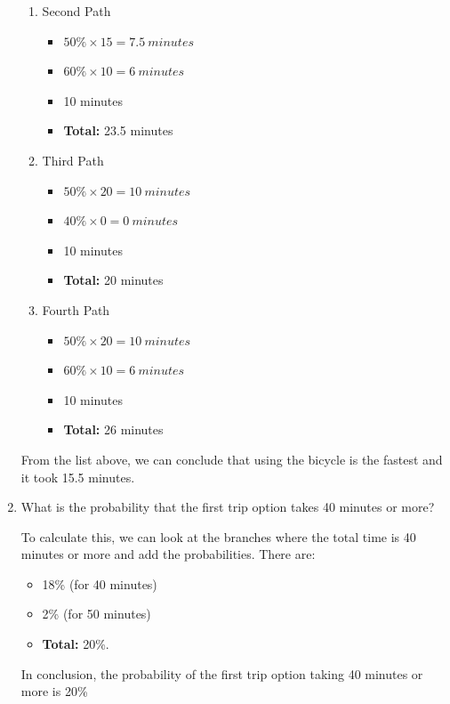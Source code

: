 \documentclass[12pt,titlepage]{article}
\begin{document}
\begin{enumerate}
{\begin{itemize}
{\begin{enumerate}
{                    }
                    \item {
                        Second Path
                        \begin{itemize}
                            \item $50\% \times 15 = 7.5~minutes$
                            \item $60\% \times 10 = 6~minutes$
                            \item 10 minutes
                            \item \textbf{Total:} 23.5 minutes
                        \end{itemize}
                    }
                    \pagebreak
                    \item {
                        Third Path
                        \begin{itemize}
                            \item $50\% \times 20 = 10~minutes$
                            \item $40\% \times 0 = 0~minutes$
                            \item 10 minutes
                            \item \textbf{Total:} 20 minutes
                        \end{itemize}
                        }
                        \item {
                            Fourth Path
                        \begin{itemize}
                            \item $50\% \times 20 = 10~minutes$
                            \item $60\% \times 10 = 6~minutes$
                            \item 10 minutes
                            \item \textbf{Total:} 26 minutes
                        \end{itemize}
                    }
                \end{enumerate}
            }
        \end{itemize}
        From the list above, we can conclude that using the bicycle is the fastest and it took 15.5 minutes.
    }
    \item {
        What is the probability that the first trip option takes 40 minutes or more?

        To calculate this, we can look at the branches where the total time is 40 minutes or more and add the probabilities.
        There are:
        \begin{itemize}
            \item 18\% (for 40 minutes)
            \item 2\% (for 50 minutes)
            \item \textbf{Total:} 20\%.
        \end{itemize} 
        In conclusion, the probability of the first trip option taking 40 minutes or more is 20\%
    }
\end{enumerate}
\end{document}
